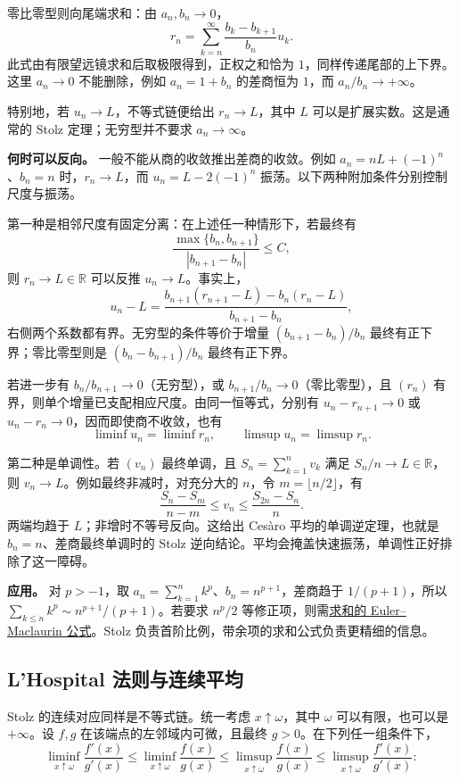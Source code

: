 \documentclass[12pt,fontset=fandol]{ctexart}
\begin{document}
零比零型则向尾端求和：由 $a_n,b_n\to0$，
\[
r_n=\sum_{k=n}^{\infty}\frac{b_k-b_{k+1}}{b_n}u_k.
\]
此式由有限望远镜求和后取极限得到，正权之和恰为 $1$，同样传递尾部的上下界。这里 $a_n\to0$ 不能删除，例如 $a_n=1+b_n$ 的差商恒为 $1$，而 $a_n/b_n\to+\infty$。

特别地，若 $u_n\to L$，不等式链便给出 $r_n\to L$，其中 $L$ 可以是扩展实数。这是通常的 Stolz 定理；无穷型并不要求 $a_n\to\infty$。

\textbf{何时可以反向。} 一般不能从商的收敛推出差商的收敛。例如 $a_n=nL+(-1)^n$、$b_n=n$ 时，$r_n\to L$，而 $u_n=L-2(-1)^n$ 振荡。以下两种附加条件分别控制尺度与振荡。

第一种是相邻尺度有固定分离：在上述任一种情形下，若最终有
\[
\frac{\max\{b_n,b_{n+1}\}}{|b_{n+1}-b_n|}\leq C,
\]
则 $r_n\to L\in\mathbb R$ 可以反推 $u_n\to L$。事实上，
\[
u_n-L=
\frac{b_{n+1}(r_{n+1}-L)-b_n(r_n-L)}{b_{n+1}-b_n},
\]
右侧两个系数都有界。无穷型的条件等价于增量 $(b_{n+1}-b_n)/b_n$ 最终有正下界；零比零型则是 $(b_n-b_{n+1})/b_n$ 最终有正下界。

若进一步有 $b_n/b_{n+1}\to0$（无穷型），或 $b_{n+1}/b_n\to0$（零比零型），且 $(r_n)$ 有界，则单个增量已支配相应尺度。由同一恒等式，分别有 $u_n-r_{n+1}\to0$ 或 $u_n-r_n\to0$，因而即使商不收敛，也有
\[
\liminf u_n=\liminf r_n,\qquad
\limsup u_n=\limsup r_n.
\]

第二种是单调性。若 $(v_n)$ 最终单调，且 $S_n=\sum_{k=1}^nv_k$ 满足 $S_n/n\to L\in\mathbb R$，则 $v_n\to L$。例如最终非减时，对充分大的 $n$，令 $m=\lfloor n/2\rfloor$，有
\[
\frac{S_n-S_m}{n-m}\leq v_n
\leq\frac{S_{2n}-S_n}{n}.
\]
两端均趋于 $L$；非增时不等号反向。这给出 Cesàro 平均的单调逆定理，也就是 $b_n=n$、差商最终单调时的 Stolz 逆向结论。平均会掩盖快速振荡，单调性正好排除了这一障碍。

\textbf{应用。} 对 $p>-1$，取 $a_n=\sum_{k=1}^nk^p$、$b_n=n^{p+1}$，差商趋于 $1/(p+1)$，所以 $\sum_{k\leq n}k^p\sim n^{p+1}/(p+1)$。若要求 $n^p/2$ 等修正项，则需\hyperref[app:taylor-em]{求和的 Euler--Maclaurin 公式}。Stolz 负责首阶比例，带余项的求和公式负责更精细的信息。

\subsection{L’Hospital 法则与连续平均}

\label{app:limit-lhospital}

Stolz 的连续对应同样是不等式链。统一考虑 $x\uparrow\omega$，其中 $\omega$ 可以有限，也可以是 $+\infty$。设 $f,g$ 在该端点的左邻域内可微，且最终 $g>0$。在下列任一组条件下，
\[
\liminf_{x\uparrow\omega}\frac{f'(x)}{g'(x)}
\leq\liminf_{x\uparrow\omega}\frac{f(x)}{g(x)}
\leq\limsup_{x\uparrow\omega}\frac{f(x)}{g(x)}
\leq\limsup_{x\uparrow\omega}\frac{f'(x)}{g'(x)}:
\]
\end{document}
